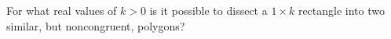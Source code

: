 For what real values of $k>0$ is it possible to dissect a $1 \times k$ rectangle into two similar, but noncongruent, polygons?